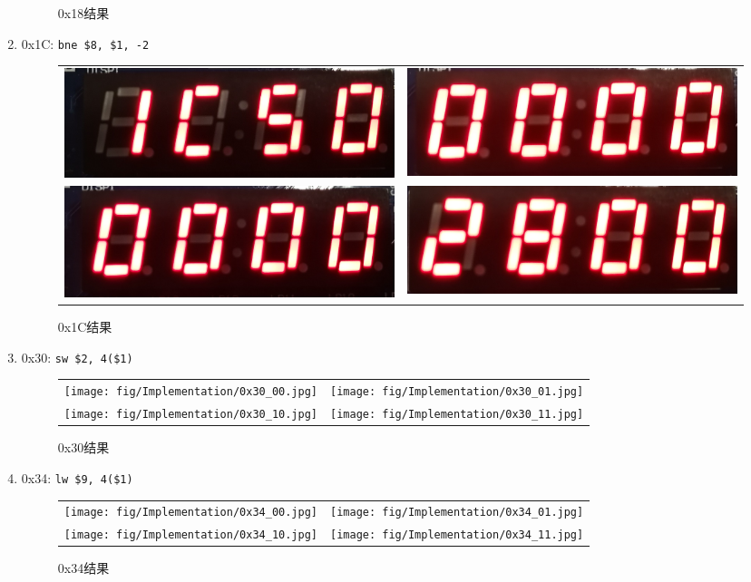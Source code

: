 \begin{enumerate}
\begin{figure}[H]
\begin{tabular}{cc}
    \end{tabular}
    \caption{0x18结果}
    \end{figure}
    \item 0x1C: \verb'bne $8, $1, -2'
    \begin{figure}[H]
    \centering
    \begin{tabular}{cc}
    \includegraphics[width=0.3\linewidth]{fig/Implementation/0x1c_00.jpg}&
    \includegraphics[width=0.3\linewidth]{fig/Implementation/0x1c_01.jpg}\\
    \includegraphics[width=0.3\linewidth]{fig/Implementation/0x1c_10.jpg}&
    \includegraphics[width=0.3\linewidth]{fig/Implementation/0x1c_11.jpg}
    \end{tabular}
    \caption{0x1C结果}
    \end{figure}
    \item 0x30: \verb'sw $2, 4($1)'
    \begin{figure}[H]
    \centering
    \begin{tabular}{cc}
    \texttt{[image: fig/Implementation/0x30\_00.jpg]}&
    \texttt{[image: fig/Implementation/0x30\_01.jpg]}\\
    \texttt{[image: fig/Implementation/0x30\_10.jpg]}&
    \texttt{[image: fig/Implementation/0x30\_11.jpg]}
    \end{tabular}
    \caption{0x30结果}
    \end{figure}
    \item 0x34: \verb'lw $9, 4($1)'
    \begin{figure}[H]
    \centering
    \begin{tabular}{cc}
    \texttt{[image: fig/Implementation/0x34\_00.jpg]}&
    \texttt{[image: fig/Implementation/0x34\_01.jpg]}\\
    \texttt{[image: fig/Implementation/0x34\_10.jpg]}&
    \texttt{[image: fig/Implementation/0x34\_11.jpg]}
    \end{tabular}
    \caption{0x34结果}
    \end{figure}
\end{enumerate}